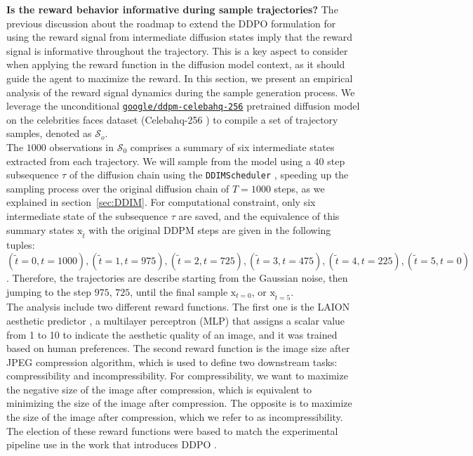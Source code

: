\textbf{Is the reward behavior informative during sample trajectories?} The previous discussion about the roadmap to extend the DDPO formulation for using the reward signal from intermediate diffusion states imply that the reward signal is informative throughout the trajectory. This is a key aspect to consider when applying the reward function in the diffusion model context, as it should guide the agent to maximize the reward. In this section, we present an empirical analysis of the reward signal dynamics during the sample generation process. We leverage the unconditional \href{https://huggingface.co/google/ddpm-celebahq-256}{\texttt{google/ddpm-celebahq-256}} \cite{ho2020denoising} pretrained diffusion model on the celebrities faces dataset (Celebahq-256 \citep{karras2017progressive}) to compile a set of trajectory samples, denoted as $\mathcal{S}_o$. \\

\noindent The $1000$ observations in $\mathcal{S}_{0}$ comprises a summary of six intermediate states extracted from each trajectory. We will sample from the model using a $40$ step subsequence $\tau$ of the diffusion chain using the \texttt{DDIMScheduler} \cite{song2020denoising}, speeding up the sampling process over the original diffusion chain of $T=1000$ steps, as we explained in section~\ref{sec:DDIM}. For computational constraint, only six intermediate state of the subsequence $\tau$ are saved, and the equivalence of this summary states $\mathrm{x}_{\tilde{t}}$ with the original DDPM steps are given in the following tuples: $(\tilde{t}=0, t=1000), (\tilde{t}=1, t=975), (\tilde{t}=2, t=725), (\tilde{t}=3, t=475), (\tilde{t}=4, t=225), (\tilde{t}=5, t=0)$. Therefore, the trajectories are describe starting from the Gaussian noise, then jumping to the step $975$, $725$, until the final sample $\mathrm{x}_{t=0}$, or $\mathrm{x}_{\tilde{t}=5}$. \\


\noindent The analysis include two different reward functions. The first one is the LAION aesthetic predictor \cite{laion2022}, a multilayer perceptron (MLP) that assigns a scalar value from 1 to 10 to indicate the aesthetic quality of an image, and it was trained based on human preferences. The second reward function is the image size after JPEG compression algorithm, which is used to define two downstream tasks: compressibility and incompressibility. For compressibility, we want to maximize the negative size of the image after compression, which is equivalent to minimizing the size of the image after compression. The opposite is to maximize the size of the image after compression, which we refer to as incompressibility. The election of these reward functions were based to match the experimental pipeline use in the work that introduces DDPO \cite{black2023training}. \\

